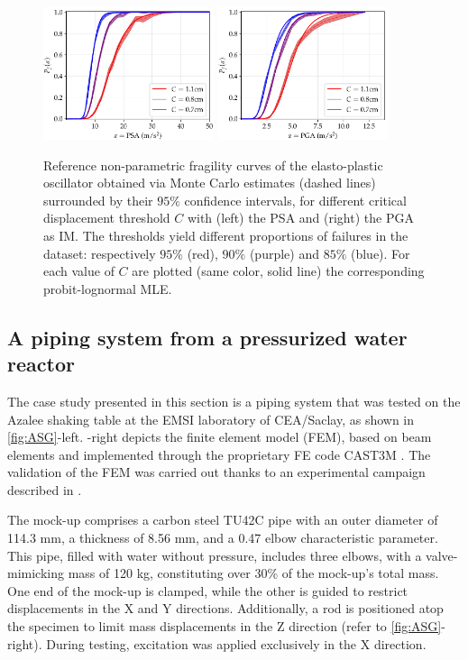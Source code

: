     \begin{figure}[h]
        \centering
        \includegraphics[width=5cm]{figures/intro-frags/oscill/refs_PSA.pdf}
        \includegraphics[width=5cm]{figures/intro-frags/oscill/refs_PGA.pdf}
        \caption{{Reference non-parametric fragility curves of the elasto-plastic oscillator obtained via Monte Carlo estimates (dashed lines) surrounded by their $95\%$ confidence intervals, for different critical displacement threshold $C$ with (left) the PSA and (right) the PGA as IM.} The thresholds yield different proportions of failures in the dataset: respectively $95\%$ (red), $90\%$ (purple) and $85\%$ (blue).
        For each value of $C$ are plotted (same color, solid line) the corresponding probit-lognormal MLE.}
        \label{fig:intro-frags:oscillrefs}
    \end{figure}


    
    \subsection{A piping system from a pressurized water reactor}\label{sec:intro-frags:piping}

    {The case study presented in this section is a piping system that was tested on the Azalee shaking table at the EMSI laboratory of CEA/Saclay, as shown in \cref{fig:ASG}-left. -right depicts the finite element model (FEM), based on beam elements and implemented through the proprietary FE code CAST3M \citep{cea_cast3m_2019}. The validation of the FEM was carried out thanks to an experimental campaign described in \cite{touboul_seismic_1999}.}

    The mock-up comprises a carbon steel TU42C pipe with an outer diameter of 114.3 mm, a thickness of 8.56 mm, and a 0.47 elbow characteristic parameter. This pipe, filled with water without pressure, includes three elbows, with a valve-mimicking mass of 120 kg, constituting over 30\% of the mock-up's total mass. One end of the mock-up is clamped, while the other is guided to restrict displacements in the X and Y directions. Additionally, a rod is positioned atop the specimen to limit mass displacements in the Z direction (refer to \cref{fig:ASG}-right). During testing, excitation was applied exclusively in the X direction.



